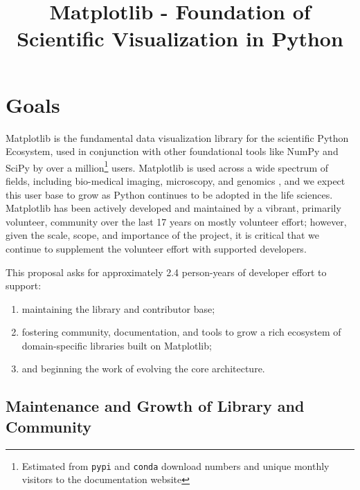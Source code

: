 \documentclass[12pt,letterpaper]{article}  %
\begin{document}
\title{Matplotlib - Foundation of Scientific Visualization in Python}
\author{}
\maketitle

\section{Goals}

Matplotlib\cite{Hunter:2007} is the fundamental
data visualization library for the scientific Python Ecosystem, used
in conjunction with other foundational tools like NumPy and
SciPy \cite{Jones2001,2020SciPy-NMeth} by over a million\footnote{Estimated from \texttt{pypi}
and \texttt{conda} download numbers and unique monthly visitors to the documentation website} users.
Matplotlib is used across a wide spectrum of fields, including bio-medical imaging,
microscopy, and genomics \cite{Carpenter2006,Wolf2018,10.7717/peerj.453,
  Segata2011,10.1371/journal.pgen.1000695,HASHIMSHONY2012666,
  10.1093/bioinformatics/bts480,Carlile2014,Laganowsky2014,Jiangaac9462,
  10.3389/fninf.2014.00014}, and we expect this user base to grow as Python
  continues to be adopted in the life sciences. %
Matplotlib has been actively developed and maintained by a vibrant,
primarily volunteer, community over the last 17 years on mostly volunteer effort; however, given
the scale, scope, and importance of the project, it is critical that we
continue to supplement the volunteer effort with supported developers.

This proposal asks for approximately 2.4 person-years of developer effort to support:

\begin{enumerate}[label=\alph*),noitemsep]
  \item maintaining the library and contributor base;
  \item fostering community, documentation, and tools to grow a rich ecosystem of domain-specific libraries built on Matplotlib;
  \item and beginning the work of evolving the core architecture.
\end{enumerate}


\subsection{Maintenance and Growth of Library and Community}
\end{document}

